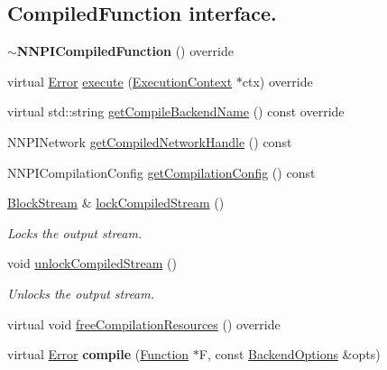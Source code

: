 \subsection*{Compiled\+Function interface.}
\begin{DoxyCompactItemize}
\item 
\mbox{\label{classglow_1_1_n_n_p_i_compiled_function_aae0e78fbbd34a6289edd139bb8d890ae}} 
{\bfseries $\sim$\+N\+N\+P\+I\+Compiled\+Function} () override
\item 
virtual \hyperlink{namespaceglow_afdb176c3a672ef66db0ecfc19a8d39bf}{Error} \hyperlink{classglow_1_1_n_n_p_i_compiled_function_a60c241e9e44d70fe5486c44f5cddb7e6}{execute} (\hyperlink{classglow_1_1_execution_context}{Execution\+Context} $\ast$ctx) override
\item 
virtual std\+::string \hyperlink{classglow_1_1_n_n_p_i_compiled_function_a389e936aa03cbbed8241a5d2b6477923}{get\+Compile\+Backend\+Name} () const override
\item 
N\+N\+P\+I\+Network \hyperlink{classglow_1_1_n_n_p_i_compiled_function_a54cda1e7ddc8111a0c8754ac4e749399}{get\+Compiled\+Network\+Handle} () const
\item 
N\+N\+P\+I\+Compilation\+Config \hyperlink{classglow_1_1_n_n_p_i_compiled_function_acb34aada4b36762ecd9bb6ffe5527bd1}{get\+Compilation\+Config} () const
\item 
\mbox{\label{classglow_1_1_n_n_p_i_compiled_function_ad1613d19deb6843b21ca0612655b5204}} 
\hyperlink{classglow_1_1_block_stream}{Block\+Stream} \& \hyperlink{classglow_1_1_n_n_p_i_compiled_function_ad1613d19deb6843b21ca0612655b5204}{lock\+Compiled\+Stream} ()
\begin{DoxyCompactList}\small\item\em Locks the output stream. \end{DoxyCompactList}\item 
\mbox{\label{classglow_1_1_n_n_p_i_compiled_function_a6624bb5317105c992dc498ad31b68854}} 
void \hyperlink{classglow_1_1_n_n_p_i_compiled_function_a6624bb5317105c992dc498ad31b68854}{unlock\+Compiled\+Stream} ()
\begin{DoxyCompactList}\small\item\em Unlocks the output stream. \end{DoxyCompactList}\item 
virtual void \hyperlink{classglow_1_1_n_n_p_i_compiled_function_aa1e428414a8a7183835f9293903682fb}{free\+Compilation\+Resources} () override
\item 
\mbox{\label{classglow_1_1_n_n_p_i_compiled_function_ab8e9471fbeb849a6c802d9747fd3348b}} 
virtual \hyperlink{namespaceglow_afdb176c3a672ef66db0ecfc19a8d39bf}{Error} {\bfseries compile} (\hyperlink{classglow_1_1_function}{Function} $\ast$F, const \hyperlink{structglow_1_1_backend_options}{Backend\+Options} \&opts)
\end{DoxyCompactItemize}
